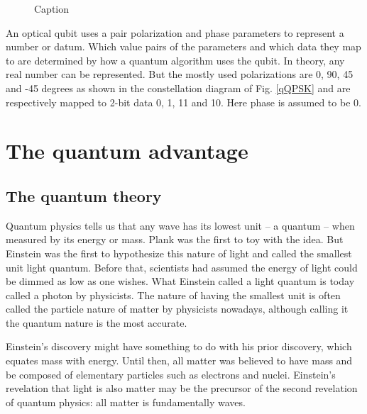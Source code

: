 \documentclass[oneside, letter, 12pt]{book}
\begin{document}
\begin{figure}%
    \caption{Caption}
\end{figure}

An optical qubit uses a pair polarization and phase parameters to represent a number or datum. Which value pairs of the parameters and which data they map to are determined by how a quantum algorithm uses the qubit. In theory, any real number can be represented. But the mostly used polarizations are 0, 90, 45 and -45 degrees as shown in the constellation diagram of Fig. \ref{qQPSK} and are respectively mapped to 2-bit data 0, 1, 11 and 10. Here phase is assumed to be 0.

\section{The quantum advantage}
\subsection{The quantum theory}
Quantum physics tells us that any wave has its lowest unit -- a quantum --  when measured by its energy or mass. Plank was the first to toy with the idea. But Einstein was the first to hypothesize this nature of light and called the smallest unit light quantum. Before that, scientists had assumed the energy of light could be dimmed as low as one wishes. What Einstein called a light quantum is today called a photon by physicists. The nature of having the smallest unit is often called the particle nature of matter by physicists nowadays, although calling it the quantum nature is the most accurate.

Einstein's discovery might have something to do with his prior discovery, which equates mass with energy. Until then, all matter was believed to have mass and be composed of elementary particles such as electrons and nuclei. Einstein's revelation that light is also matter may be the precursor of the second revelation of quantum physics: all matter is fundamentally waves.
\end{document}
